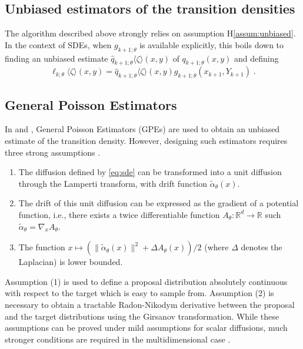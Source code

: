 \documentclass[12pt]{article}
\newcommand{\md}[1]{g_{#1}}
\newcommand{\parvec}{\theta}
\newcommand{\hd}[1]{q_{#1}}
\newcommand{\hdhat}[1]{\widehat{q}_{#1}}
\newcommand{\rset}{\ensuremath{\mathbb{R}}}
\newcommand{\eqsp}{\;}
\newcommand{\hatqg}[1]{\mathsf{\ell}_{#1}}
\begin{document}
\subsection{Unbiased estimators of the transition densities}

The algorithm described above strongly relies on assumption H\ref{assum:unbiased}. 
In the context of SDEs, when $\md{k+1;\parvec}$ is available explicitly, this boils down to finding an unbiased estimate $\hdhat{k+1;\parvec}\langle \zeta\rangle(x,y)$ of $\hd{k+1;\parvec}(x,y)$ and defining
\[
\hatqg{k;\parvec}\langle \zeta\rangle(x,y) = \hdhat{k+1;\parvec}\langle \zeta\rangle(x,y)\md{k+1;\parvec}(x_{k+1},Y_{k+1})\eqsp.
\]

\subsection{General Poisson Estimators}
In \cite{olsson2011particle} and \cite{gloaguen2018online}, General Poisson Estimators (GPEs) are used to obtain an unbiased estimate of the transition density.  However, designing such estimators requires three strong assumptions \citep{beskos2006retrospective}.

\begin{enumerate}
\item The diffusion defined by \eqref{eq:sde} can be transformed into a unit diffusion through the Lamperti transform, with drift function $\tilde{\alpha}_\parvec(x)$.
\item The drift of this unit diffusion can be expressed as the gradient of a potential function, i.e., there exists a twice differentiable function $A_{\parvec}:\mathbb{R}^d \to \rset$ such $\tilde{\alpha}_{\parvec} = \nabla_x A_{\parvec}$.
\item The function $x\mapsto (\|\tilde{\alpha}_{\parvec}(x)\|^2 + \Delta A_{\parvec}(x))/2$ (where $\Delta$ denotes the Laplacian) is lower bounded.
\end{enumerate}

Assumption (1)
 is used to define a proposal distribution absolutely continuous with respect to the target which is easy to sample from. 
Assumption (2)
 is necessary to obtain a tractable Radon-Nikodym derivative between the proposal and the target distributions using the Girsanov transformation. 
 While these assumptions can be proved under mild assumptions for scalar diffusions, much stronger conditions are required in the multidimensional case \cite{ait-sahalia2008closed}. 
\end{document}
